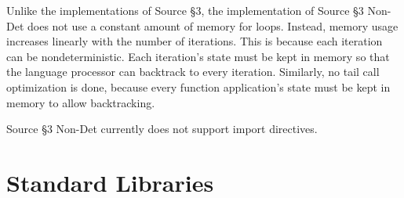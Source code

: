 Unlike the implementations of Source \S 3,  the implementation of Source \S 3 Non-Det does not use a constant amount of memory for loops. Instead, memory usage increases linearly with the number of iterations. This is because each iteration can be nondeterministic. Each iteration's state must be kept in memory so that the language processor can backtrack to every iteration. Similarly, no tail call optimization is done, because every function application's state must be kept in memory to allow backtracking.

Source \S 3 Non-Det currently does not support import directives.



\newpage



\newpage





















\section{Standard Libraries}















\newpage



\newpage



\newpage



    
